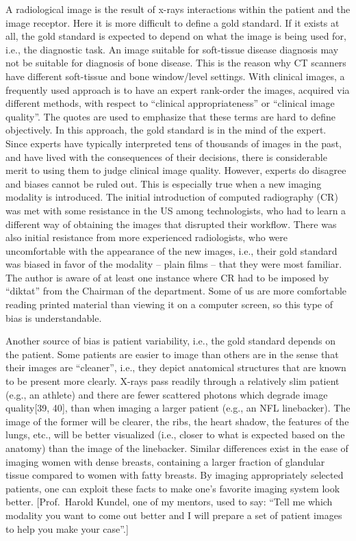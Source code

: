 \documentclass[
]{book}
\begin{document}
A radiological image is the result of x-rays interactions within the patient and the image receptor. Here it is more difficult to define a gold standard. If it exists at all, the gold standard is expected to depend on what the image is being used for, i.e., the diagnostic task. An image suitable for soft-tissue disease diagnosis may not be suitable for diagnosis of bone disease. This is the reason why CT scanners have different soft-tissue and bone window/level settings. With clinical images, a frequently used approach is to have an expert rank-order the images, acquired via different methods, with respect to ``clinical appropriateness'' or ``clinical image quality''. The quotes are used to emphasize that these terms are hard to define objectively. In this approach, the gold standard is in the mind of the expert. Since experts have typically interpreted tens of thousands of images in the past, and have lived with the consequences of their decisions, there is considerable merit to using them to judge clinical image quality. However, experts do disagree and biases cannot be ruled out. This is especially true when a new imaging modality is introduced. The initial introduction of computed radiography (CR) was met with some resistance in the US among technologists, who had to learn a different way of obtaining the images that disrupted their workflow. There was also initial resistance from more experienced radiologists, who were uncomfortable with the appearance of the new images, i.e., their gold standard was biased in favor of the modality -- plain films -- that they were most familiar. The author is aware of at least one instance where CR had to be imposed by ``diktat'' from the Chairman of the department. Some of us are more comfortable reading printed material than viewing it on a computer screen, so this type of bias is understandable.

Another source of bias is patient variability, i.e., the gold standard depends on the patient. Some patients are easier to image than others are in the sense that their images are ``cleaner'', i.e., they depict anatomical structures that are known to be present more clearly. X-rays pass readily through a relatively slim patient (e.g., an athlete) and there are fewer scattered photons which degrade image quality{[}39, 40{]}, than when imaging a larger patient (e.g., an NFL linebacker). The image of the former will be clearer, the ribs, the heart shadow, the features of the lungs, etc., will be better visualized (i.e., closer to what is expected based on the anatomy) than the image of the linebacker. Similar differences exist in the ease of imaging women with dense breasts, containing a larger fraction of glandular tissue compared to women with fatty breasts. By imaging appropriately selected patients, one can exploit these facts to make one's favorite imaging system look better. {[}Prof.~Harold Kundel, one of my mentors, used to say: ``Tell me which modality you want to come out better and I will prepare a set of patient images to help you make your case''.{]}
\end{document}
